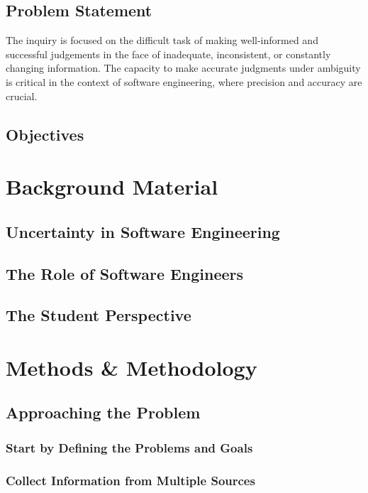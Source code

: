 \documentclass[a4paper,12pt]{report}
\begin{document}
\section{Problem Statement}
The inquiry is focused on the difficult task of making well-informed and successful judgements in the face of inadequate, inconsistent, or constantly changing information. The capacity to make accurate judgments under ambiguity is critical in the context of software engineering, where precision and accuracy are crucial.
\section{Objectives}

\chapter{Background Material}
\section{Uncertainty in Software Engineering}
\section{The Role of Software Engineers}
\section{The Student Perspective}

\chapter{Methods \& Methodology}
\section{Approaching the Problem}
\subsection{Start by Defining the Problems and Goals}
\subsection{Collect Information from Multiple Sources}
\end{document}
